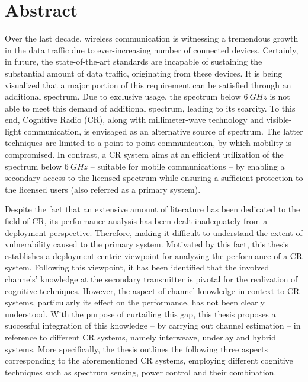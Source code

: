 
\chapter*{Abstract}
Over the last decade, wireless communication is witnessing a tremendous growth in the data traffic due to ever-increasing number of connected devices. Certainly, in future, the state-of-the-art standards are incapable of sustaining the substantial amount of data traffic, originating from these devices. It is being visualized that a major portion of this requirement can be satisfied through an additional spectrum. Due to exclusive usage, the spectrum below $\SI{6}{GHz}$ is not able to meet this demand of additional spectrum, leading to its scarcity. To this end, Cognitive Radio (CR), along with millimeter-wave technology and visible-light communication, is envisaged as an alternative source of spectrum. The latter techniques are limited to a point-to-point communication, by which mobility is compromised. In contrast, a CR system aims at an efficient utilization of the spectrum below $\SI{6}{GHz}$ -- suitable for mobile communications -- by enabling a secondary access to the licensed spectrum while ensuring a sufficient protection to the licensed users (also referred as a primary system). %


Despite the fact that an extensive amount of literature has been dedicated to the field of CR, its performance analysis has been dealt inadequately from a deployment perspective. Therefore, making it difficult to understand the extent of vulnerability caused to the primary system. Motivated by this fact, this thesis establishes a deployment-centric viewpoint for analyzing the performance of a CR system. Following this viewpoint, it has been identified that the involved channels' knowledge at the secondary transmitter is pivotal for the realization of cognitive techniques. However, the aspect of channel knowledge in context to CR systems, particularly its effect on the performance, has not been clearly understood. With the purpose of curtailing this gap, this thesis proposes a successful integration of this knowledge -- by carrying out channel estimation -- in reference to different CR systems, namely interweave, underlay and hybrid systems. More specifically, the thesis outlines the following three aspects corresponding to the aforementioned CR systems, employing different cognitive techniques such as spectrum sensing, power control and their combination.

